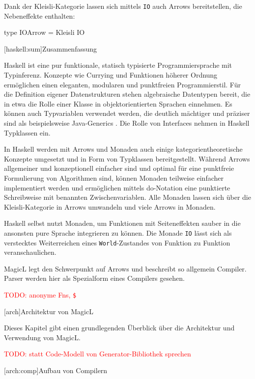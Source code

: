 \documentclass[12pt, a4paper, bibgerm]{scrbook}
\newenvironment{DIFnomarkup}{}{}
\newcommand\icode[1]{\lstinline?#1?}
\newcommand{\todo}[1]{
  \textcolor{red}{TODO: #1}
}
\newcommand\lchapter{}
\newcommand\lsection{}
\begin{document}
Dank der Kleisli-Kategorie lassen sich mittels \icode{IO} auch Arrows
bereitstellen, die Nebeneffekte enthalten:
\begin{DIFnomarkup}\begin{code}
type IOArrow = Kleisli IO
\end{code}\end{DIFnomarkup}

\lsection[haskell:sum]{Zusammenfassung}

Haskell ist eine pur funktionale, statisch typisierte Programmiersprache
mit Typinferenz. Konzepte wie Currying und Funktionen höherer Ordnung
ermöglichen einen eleganten, modularen und punktfreien
Programmierstil. Für die Definition eigener Datenstrukturen stehen
algebraische Datentypen bereit, die in etwa die Rolle einer Klasse in
objektorientierten Sprachen einnehmen. Es können auch Typvariablen
verwendet werden, die deutlich mächtiger und präziser sind als
beispielsweise Java-Generics \cite{JavaGenerics}. Die Rolle von
Interfaces nehmen in Haskell Typklassen ein.

In Haskell werden mit Arrows und Monaden auch einige
kategorientheoretische Konzepte umgesetzt und in Form von Typklassen
bereitgestellt. Während Arrows allgemeiner und konzeptionell einfacher
sind und optimal für eine punktfreie Formulierung von Algorithmen sind,
können Monaden teilweise einfacher implementiert werden und ermöglichen
mittels do-Notation eine punktierte Schreibweise mit benannten
Zwischenvariablen. Alle Monaden lassen sich über die Kleisli-Kategorie
in Arrows umwandeln und viele Arrows in Monaden.

Haskell selbst nutzt Monaden, um Funktionen mit Seiteneffekten sauber in
die ansonsten pure Sprache integrieren zu können. Die Monade \icode{IO}
lässt sich als verstecktes Weiterreichen eines \icode{World}-Zustandes von
Funktion zu Funktion veranschaulichen.

MagicL legt den Schwerpunkt auf Arrows und beschreibt so allgemein
Compiler. Parser werden hier als Spezialform eines Compilers gesehen.

\todo{anonyme Fns, \icode{$}} %

\lchapter[arch]{Architektur von MagicL}

Dieses Kapitel gibt einen grundlegenden Überblick über die Architektur
und Verwendung von MagicL.

\todo{statt Code-Modell von Generator-Bibliothek sprechen}

\lsection[arch:comp]{Aufbau von Compilern}
\end{document}
